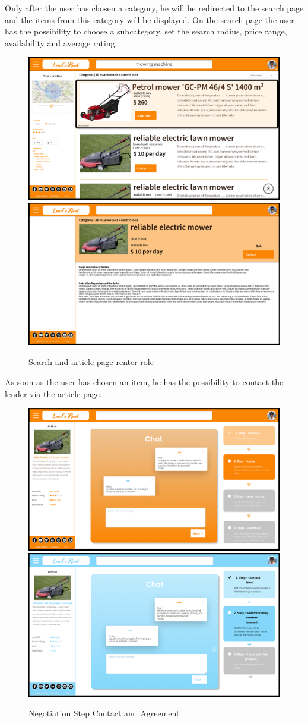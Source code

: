 \noindent
Only after the user has chosen a category, he will be redirected to the search page and the items from this category will be displayed.
On the search page the user has the possibility to choose a subcategory, set the search radius, price range, availability and average rating.

\begin{figure}[H]
	\centering
	\includegraphics[width=0.49\linewidth]{abb/9search}
	\includegraphics[width=0.49\linewidth]{abb/10itemrent}
	\caption{Search and article page renter role}
	\label{fig:search}
	\centering
\end{figure}

\newpage
\noindent
As soon as the user has chosen an item, he has the possibility to contact the lender via the article page.

\begin{figure}[H]
	\centering
	\includegraphics[width=0.49\linewidth]{abb/12step2}
	\includegraphics[width=0.49\linewidth]{abb/5step1}
	\caption{Negotiation Step Contact and Agreement}
	\label{fig:negotiation1}
	\centering
\end{figure}

